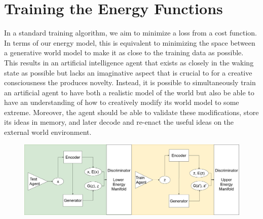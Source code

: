 \documentclass{article}
\begin{document}


\section{Training the Energy Functions}



In a standard training algorithm, we aim to minimize a loss from a cost function. In terms of our energy model, this is equivalent to minimizing the space between a generative world model to make it as close to the training data as possible. This results in an artificial intelligence agent that exists as closely in the waking state as possible but lacks an imaginative aspect that is crucial to for a creative consciousness the produces novelty. Instead, it is possible to simultaneously train an artificial agent to have both a realistic model of the world but also be able to have an understanding of how to creatively modify its world model to some extreme. Moreover, the agent should be able to validate these modifications, store its ideas in memory, and later decode and re-enact the useful ideas on the external world environment. 
\begin{figure}[H]
    \centering
    \includegraphics[width=13.9cm]{dream-model-v2.png}
\end{figure}
\end{document}
